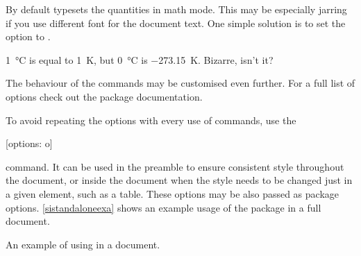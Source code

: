 By default  typesets the quantities in math mode. This may be
especially jarring if you use different font for the document text. One simple
solution is to set the  option to .
\begin{example}[examplewidth=0.35\linewidth]
\setmainfont{Source Sans Pro} %
\qty{1}{\degreeCelsius} is
equal to \qty{1}{\kelvin}, but
\qty[mode = text]{0}{\degreeCelsius}
is \qty[mode = text]{-273.15}{\kelvin}.
Bizarre, isn't it?
\end{example}

The behaviour of the commands may be customised even further. For a full list
of options check out the  package documentation.

To avoid repeating the options with every use of commands, use the
\begin{lscommand}
  [options: o]
\end{lscommand}
command. It can be used in the preamble to ensure consistent style throughout
the document, or inside the document when the style needs to be changed just
in a given element, such as a table. These options may be also passed as package
options. \autoref{sistandaloneexa} shows an example usage of the package in
a full document.
\begin{listing}
  \caption{An example of using  in a document.}%
  \label{sistandaloneexa}
\end{listing}

